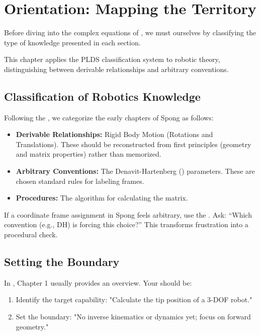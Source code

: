 \chapter{Orientation: Mapping the Territory}


Before diving into the complex equations of \textcite{spong2020}, we must  ourselves by classifying the type of knowledge presented in each section.

\begin{chapteroverview}
    This chapter applies the PLDS classification system to robotic theory, distinguishing between derivable relationships and arbitrary conventions.
\end{chapteroverview}

\section{Classification of Robotics Knowledge}

Following the , we categorize the early chapters of Spong as follows:

\begin{itemize}
    \item \textbf{Derivable Relationships:} Rigid Body Motion (Rotations and Translations). These should be reconstructed from first principles (geometry and matrix properties) rather than memorized.
    \item \textbf{Arbitrary Conventions:} The Denavit-Hartenberg () parameters. These are chosen standard rules for labeling frames.
    \item \textbf{Procedures:} The algorithm for calculating the  matrix.
\end{itemize}

\begin{designrule}
    If a coordinate frame assignment in Spong feels arbitrary, use the . Ask: ``Which convention (e.g., DH) is forcing this choice?'' This transforms frustration into a procedural check.
\end{designrule}

\section{Setting the Boundary}

In \textcite{spong2020}, Chapter 1 usually provides an overview. Your  should be:
\begin{enumerate}
    \item Identify the target capability: "Calculate the tip position of a 3-DOF robot."
    \item Set the boundary: "No inverse kinematics or dynamics yet; focus on forward geometry."
\end{enumerate}
